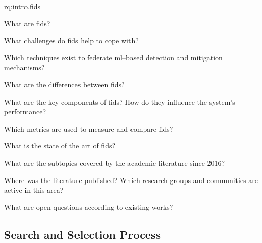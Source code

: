 \begin{subquestions}{rq:intro.fids}
    \item What are \gls{fids}?
    \begin{questions}
        \item What challenges do \gls{fids} help to cope with? \label{rq:sota.challenges}
        \item Which techniques exist to federate \gls{ml}--based detection and mitigation mechanisms? \label{rq:sota.techniques}
    \end{questions}

    \item What are the differences between \gls{fids}?
    \begin{questions}
        \item What are the key components of \gls{fids}? How do they influence the system's performance? \label{rq:sota.components}
        \item Which metrics are used to measure and compare \gls{fids}? \label{rq:sota.metrics}
    \end{questions}

    \item What is the state of the art of \gls{fids}?
    \begin{questions}
        \item What are the subtopics covered by the academic literature since 2016? \label{rq:sota.literature}
        \item Where was the literature published? Which research groups and communities are active in this area? \label{rq:sota.wherewho}
        \item What are open questions according to existing works? \label{rq:sota.open}
    \end{questions}
\end{subquestions}


\subsection{Search and Selection Process\label{sec:sota.methodo.search}}


